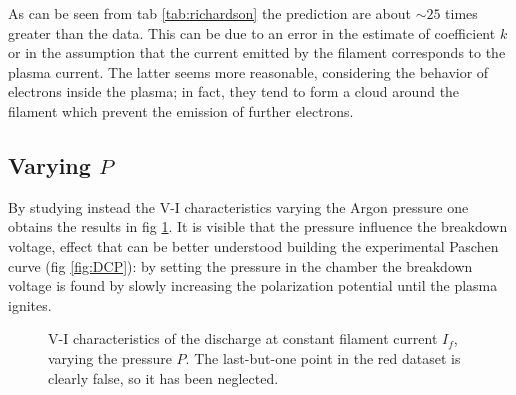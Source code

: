 \documentclass[11pt,a4 paper]{article}
\begin{document}
As can be seen from tab \ref{tab:richardson} the prediction are about $\sim 25$ times greater than the data. This can be due to an error in the estimate of coefficient $k$ or in the assumption that the current emitted by the filament corresponds to the plasma current. The latter seems more reasonable, considering the behavior of electrons inside the plasma; in fact, they tend to form a cloud around the filament which prevent the emission of further electrons.



\subsection{Varying $P$}

By studying instead the V-I characteristics varying the Argon pressure one obtains the results in fig \ref{fig:constIf}. It is visible that the pressure influence the breakdown voltage, effect that can be better understood building the experimental Paschen curve (fig \ref{fig:DCP}): by setting the pressure in the chamber the breakdown voltage is found by slowly increasing the polarization potential until the plasma ignites.

\begin{figure}[H]
  \centering
  \caption{V-I characteristics of the discharge at constant filament current $I_f$, varying the pressure $P$. The last-but-one point in the red dataset is clearly false, so it has been neglected.}
  \label{fig:constIf}
\end{figure}
\end{document}
